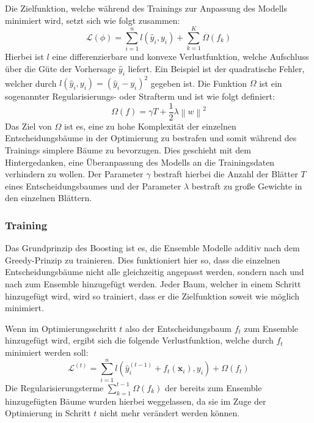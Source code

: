 Die Zielfunktion, welche w\"ahrend des Trainings zur Anpassung des Modells minimiert wird, setzt sich wie folgt zusammen:
\begin{equation}
    \mathcal{L}(\phi) = \sum_{i=1}^n l(\hat{y}_i, y_i) + \sum_{k=1}^K \Omega(f_k)
\end{equation}
Hierbei ist $l$ eine differenzierbare und konvexe Verlustfunktion, welche Aufschluss \"uber die G\"ute der Vorhersage $\hat{y}_i$
liefert. Ein Beispiel ist der quadratische Fehler, welcher durch $l(\hat{y}_i, y_i) = (\hat{y}_i - y_i)^2$ gegeben ist.
Die Funktion $\Omega$ ist ein sogenannter Regularisierungs- oder Strafterm und ist wie folgt definiert:
\begin{equation}
    \Omega(f) = \gamma T + \frac{1}{2} \lambda \left \lVert w \right \rVert^2
\end{equation}
Das Ziel von $\Omega$ ist es, eine zu hohe Komplexit\"at der einzelnen Entscheidungsb\"aume in der Optimierung zu bestrafen und somit
w\"ahrend des Trainings simplere B\"aume zu bevorzugen. Dies geschieht mit dem Hintergedanken, eine \"Uberanpassung des Modells an
die Trainingsdaten verhindern zu wollen.
Der Parameter $\gamma$ bestraft hierbei die Anzahl der Bl\"atter $T$ eines Entscheidungsbaumes und der Parameter $\lambda$ bestraft
zu gro{\ss}e Gewichte in den einzelnen Bl\"attern.

\subsubsection{Training}

Das Grundprinzip des Boosting ist es, die Ensemble Modelle additiv nach dem Greedy-Prinzip zu trainieren.
Dies funktioniert hier so, dass die einzelnen Entscheidungsb\"aume nicht alle gleichzeitig angepasst werden, sondern
nach und nach zum Ensemble hinzugef\"ugt werden. Jeder Baum, welcher in einem Schritt hinzugef\"ugt wird, wird so trainiert,
dass er die Zielfunktion soweit wie m\"oglich minimiert.

Wenn im Optimierungsschritt $t$ also der Entscheidungsbaum $f_t$ zum Ensemble hinzugef\"ugt wird, ergibt sich die folgende
Verlustfunktion, welche durch $f_t$ minimiert werden soll:
\begin{equation}
    \mathcal{L}^{(t)} = \sum_{i=1}^n l(\hat{y}^{(t-1)}_i + f_t(\mathbf{x}_i), y_i) + \Omega(f_t)
\end{equation}
Die Regularisierungsterme $\sum_{k=1}^{t-1} \Omega(f_k)$ der bereits zum Ensemble hinzugef\"ugten B\"aume wurden hierbei weggelassen,
da sie im Zuge der Optimierung in Schritt $t$ nicht mehr ver\"andert werden k\"onnen.

